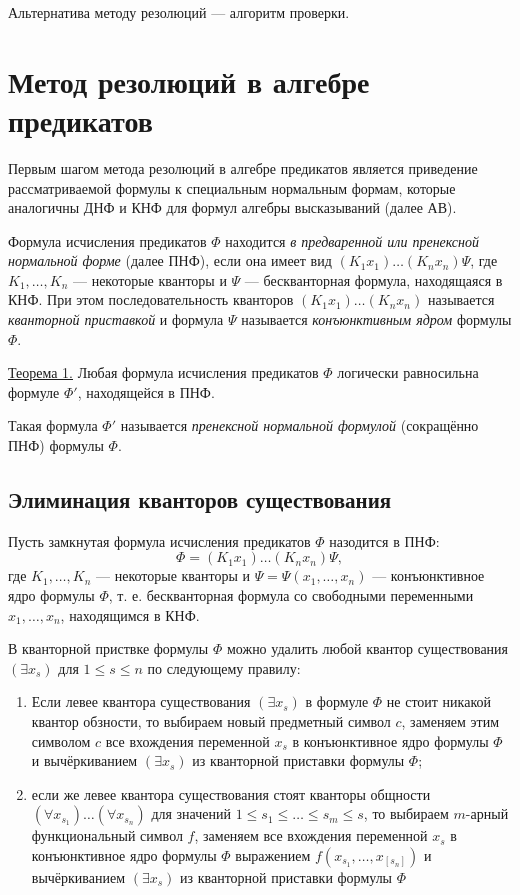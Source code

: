 Альтернатива методу резолюций --- алгоритм проверки.


\section{Метод резолюций в алгебре предикатов}
Первым шагом метода резолюций в алгебре предикатов является приведение рассматриваемой формулы к специальным нормальным формам, которые аналогичны ДНФ и КНФ для формул алгебры высказываний (далее АВ).

Формула исчисления предикатов $\Phi$ находится {\it в предваренной или пренексной нормальной форме} (далее ПНФ), если она имеет вид $(K_1 x_1)\dots(K_n x_n)\Psi$, где $K_1,\dots,K_n$ --- некоторые кванторы и $\Psi$ --- бескванторная формула, находящаяся в КНФ. При этом последовательность кванторов $(K_1 x_1)\dots(K_n x_n)$ называется {\it кванторной приставкой} и формула $\Psi$ называется {\it конъюнктивным ядром} формулы $\Phi$.

\underline{Теорема 1.} Любая формула исчисления предикатов $\Phi$ логически равносильна формуле $\Phi'$, находящейся в ПНФ.

Такая формула $\Phi'$ называется {\it пренексной нормальной формулой} (сокращённо ПНФ) формулы $\Phi$.

\subsection{Элиминация кванторов существования}

Пусть замкнутая формула исчисления предикатов $\Phi$ назодится в ПНФ:
\begin{equation*}
    \Phi = (K_1 x_1)\dots(K_n x_n)\Psi,
\end{equation*}
где $K_1,\dots,K_n$ --- некоторые кванторы и $\Psi = \Psi(x_1,\dots,x_n)$ --- конъюнктивное ядро формулы $\Phi$, т. е. бескванторная формула со свободными переменными $x_1,\dots,x_n$, находящимся в КНФ.

В кванторной приствке формулы $\Phi$ можно удалить любой квантор существования $(\exists x_s)$ для $1 \leq s \leq n$ по следующему правилу:
\begin{enumerate}
    \item Если левее квантора существования $(\exists x_s)$ в формуле $\Phi$ не стоит никакой квантор обзности, то выбираем новый предметный символ $c$, заменяем этим символом $c$ все вхождения переменной $x_s$ в конъюнктивное ядро формулы $\Phi$ и вычёркиванием $(\exists x_s)$ из кванторной приставки формулы $\Phi$;
    \item если же левее квантора существования стоят кванторы общности $(\forall x_{s_1})\dots(\forall x_{s_n})$ для значений $1 \leq s_1 \leq \dots \leq s_m \leq s$, то выбираем $m$-арный функциональный символ $f$, заменяем все вхождения переменной $x_s$ в конъюнктивное ядро формулы $\Phi$ выражением $f(x_{s_1},\dots,x_[s_n])$ и вычёркиванием $(\exists x_s)$ из кванторной приставки формулы $\Phi$
\end{enumerate}

